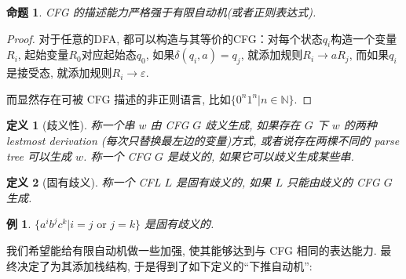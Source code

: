 \documentclass[8pt]{article}
\theoremstyle{compact}
\newtheorem{definition}{定义}[section]
\newtheorem{proposition}{命题}[section]
\newtheorem{example}{例}[section]
\begin{document}
\begin{proposition}
	CFG 的描述能力严格强于有限自动机(或者正则表达式). 
\end{proposition}
\begin{proof}
	对于任意的DFA, 都可以构造与其等价的CFG：对每个状态$q_i$构造一个变量$R_i$, 起始变量$R_0$对应起始态$q_0$, 如果$\delta(q_i, a) = q_j$, 就添加规则$R_i \to aR_j$, 而如果$q_i$是接受态, 就添加规则$R_i \to \varepsilon$. 

	而显然存在可被 CFG 描述的非正则语言, 比如$\{0^n1^n | n \in \mathbb N\}$. 
\end{proof}
\begin{definition}[歧义性]
	称一个串 $w$ 由 CFG $G$ 歧义生成, 如果存在 $G$ 下 $w$ 的两种 lestmost derivation (每次只替换最左边的变量)方式, 或者说存在两棵不同的 parse tree 可以生成 $w$. 称一个 CFG $G$ 是歧义的, 如果它可以歧义生成某些串.
\end{definition}
\begin{definition}[固有歧义]
	称一个 CFL $L$ 是固有歧义的, 如果 $L$ 只能由歧义的 CFG $G$ 生成.
\end{definition}
\begin{example}
	$\{a^ib^jc^k | i = j \textrm{ or } j = k\}$ 是固有歧义的.
\end{example}

我们希望能给有限自动机做一些加强, 使其能够达到与 CFG 相同的表达能力. 最终决定了为其添加栈结构, 于是得到了如下定义的“下推自动机”:
\end{document}
